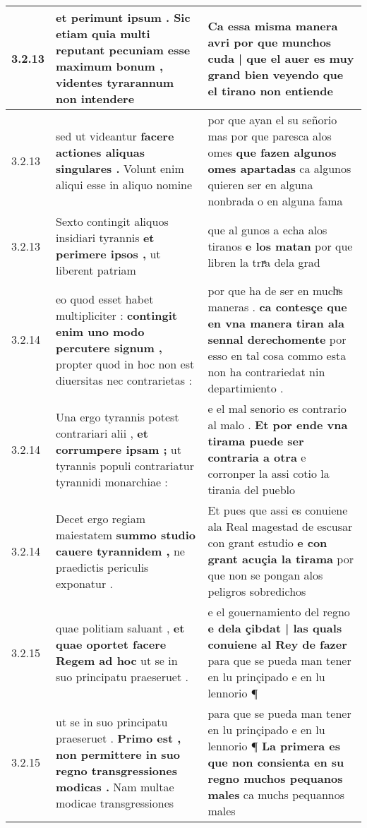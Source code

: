 \begin{tabular}{|p{1cm}|p{6.5cm}|p{6.5cm}|}
3.2.13 & et perimunt ipsum . \textbf{ Sic etiam quia multi reputant pecuniam esse maximum bonum , } videntes tyrarannum non intendere & Ca essa misma manera avri \textbf{ por que munchos cuda | que el auer es muy grand bien veyendo } que el tirano non entiende \\\hline
3.2.13 & sed ut videantur \textbf{ facere actiones aliquas singulares . } Volunt enim aliqui esse in aliquo nomine & por que ayan el su señorio mas por que paresca alos omes \textbf{ que fazen algunos omes apartadas } ca algunos quieren ser en alguna nonbrada o en alguna fama \\\hline
3.2.13 & Sexto contingit aliquos insidiari tyrannis \textbf{ et perimere ipsos , } ut liberent patriam & que al gunos a echa alos tiranos \textbf{ e los matan } por que libren la trrͣa dela grad \\\hline
3.2.14 & eo quod esset habet multipliciter : \textbf{ contingit enim uno modo percutere signum , } propter quod in hoc non est diuersitas nec contrarietas : & por que ha de ser en muchͣs maneras . \textbf{ ca contesçe que en vna manera tiran ala sennal derechomente } por esso en tal cosa commo esta non ha contrariedat nin departimiento . \\\hline
3.2.14 & Una ergo tyrannis potest contrariari alii , \textbf{ et corrumpere ipsam ; } ut tyrannis populi contrariatur tyrannidi monarchiae : & e el mal senorio es contrario al malo . \textbf{ Et por ende vna tirama puede ser contraria a otra } e corronper la assi cotio la tirania del pueblo \\\hline
3.2.14 & Decet ergo regiam maiestatem \textbf{ summo studio cauere tyrannidem , } ne praedictis periculis exponatur . & Et pues que assi es conuiene ala Real magestad de escusar con grant estudio \textbf{ e con grant acuçia la tirama } por que non se pongan alos peligros sobredichos \\\hline
3.2.15 & quae politiam saluant , \textbf{ et quae oportet facere Regem ad hoc } ut se in suo principatu praeseruet . & e el gouernamiento del regno \textbf{ e dela çibdat | las quals conuiene al Rey de fazer } para que se pueda man tener en lu prinçipado e en lu lennorio ¶ \\\hline
3.2.15 & ut se in suo principatu praeseruet . \textbf{ Primo est , non permittere in suo regno transgressiones modicas . } Nam multae modicae transgressiones & para que se pueda man tener en lu prinçipado e en lu lennorio ¶ \textbf{ La primera es que non consienta en su regno muchos pequanos males } ca muchs pequannos males \\\hline

\end{tabular}
